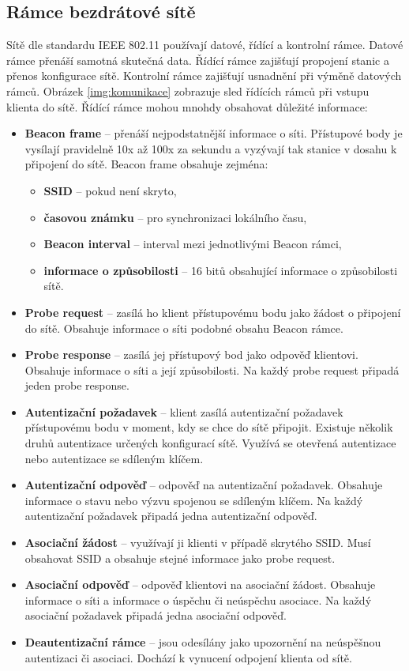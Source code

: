 \subsection{Rámce bezdrátové sítě}
Sítě dle standardu IEEE 802.11 používají datové, řídící a kontrolní rámce. Datové rámce přenáší samotná skutečná data. Řídící rámce zajišťují propojení stanic a přenos konfigurace sítě. Kontrolní rámce zajišťují usnadnění při výměně datových rámců. Obrázek \ref{img:komunikace} zobrazuje sled řídících rámců při vstupu klienta do sítě. Řídící rámce mohou mnohdy obsahovat důležité informace:
\begin{itemize}
  \item{\textbf{Beacon frame} -- přenáší nejpodstatnější informace o síti. Přístupové body je vysílají pravidelně 10x až 100x za sekundu a vyzývají tak stanice v dosahu k připojení do sítě. Beacon frame obsahuje zejména:
    \begin{itemize}
      \item{\textbf{SSID} -- pokud není skryto,}
      \item{\textbf{časovou známku} -- pro synchronizaci lokálního času,}
      \item{\textbf{Beacon interval} -- interval mezi jednotlivými Beacon rámci,}
      \item{\textbf{informace o způsobilosti} -- 16 bitů obsahující informace o způsobilosti sítě.}
    \end{itemize}
  }
  \item{\textbf{Probe request} -- zasílá ho klient přístupovému bodu jako žádost o připojení do sítě. Obsahuje informace o síti podobné obsahu Beacon rámce.}
  \item{\textbf{Probe response} -- zasílá jej přístupový bod jako odpověď klientovi. Obsahuje informace o síti a její způsobilosti. Na každý probe request připadá jeden probe response.}
  \item{\textbf{Autentizační požadavek} -- klient zasílá autentizační požadavek přístupovému bodu v moment, kdy se chce do sítě připojit. Existuje několik druhů autentizace určených konfigurací sítě. Využívá se otevřená autentizace nebo autentizace se sdíleným klíčem.}
  \item{\textbf{Autentizační odpověď} -- odpověď na autentizační požadavek. Obsahuje informace o stavu nebo výzvu spojenou se sdíleným klíčem. Na každý autentizační požadavek připadá jedna autentizační odpověď.}
  \item{\textbf{Asociační žádost} -- využívají ji klienti v případě skrytého SSID. Musí obsahovat SSID a obsahuje stejné informace jako probe request.}
  \item{\textbf{Asociační odpověď} -- odpověď klientovi na asociační žádost. Obsahuje informace o síti a informace o úspěchu či neúspěchu asociace. Na každý asociační požadavek připadá jedna asociační odpověď.}
  \item{\textbf{Deautentizační rámce} -- jsou odesílány jako upozornění na neúspěšnou autentizaci či asociaci. Dochází k vynucení odpojení klienta od sítě.}
\end{itemize}

